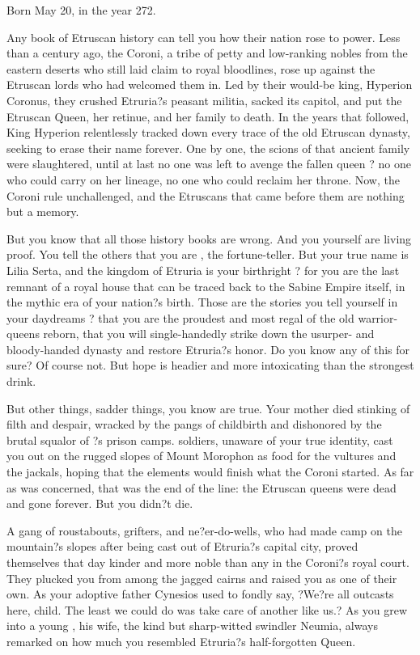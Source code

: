 \documentclass[char]{Kos}
\begin{document}
\name{\cBurglar{}}

Born May 20, in the year 272.

    Any book of Etruscan history can tell you how their nation rose to power. Less than a century ago, the Coroni, a tribe of petty and low-ranking nobles from the eastern deserts who still laid claim to royal bloodlines, rose up against the Etruscan lords who had welcomed them in. Led by their would-be king, Hyperion Coronus, they crushed Etruria?s peasant militia, sacked its capitol, and put the Etruscan Queen, her retinue, and her family to death. In the years that followed, King Hyperion relentlessly tracked down every trace of the old Etruscan dynasty, seeking to erase their name forever. One by one, the scions of that ancient family were slaughtered, until at last no one was left to avenge the fallen queen ? no one who could carry on her lineage, no one who could reclaim her throne. Now, the Coroni rule unchallenged, and the Etruscans that came before them are nothing but a memory. 

    But you know that all those history books are wrong. And you yourself are living proof. You tell the others that you are \cBurglar{}, the fortune-teller. But your true name is Lilia Serta, and the kingdom of Etruria is your birthright ? for you are the last remnant of a royal house that can be traced back to the Sabine Empire itself, in the mythic era of your nation?s birth. Those are the stories you tell yourself in your daydreams ? that you are the proudest and most regal of the old warrior-queens reborn, that you will single-handedly strike down \cEtruriaKing{} the usurper-\cEtruriaKing{\monarch} and \cEtruriaKing{\their} bloody-handed dynasty and restore Etruria?s honor. Do you know any of this for sure? Of course not. But hope is headier and more intoxicating than the strongest drink.

    But other things, sadder things, you know are true. Your mother died stinking of filth and despair, wracked by the pangs of childbirth and dishonored by the brutal squalor of \cEtruriaKing{\Monarch} \cEtruriaKing{}?s prison camps. \cEtruriaKing{\Their} soldiers, unaware of your true identity, cast you out on the rugged slopes of Mount Morophon as food for the vultures and the jackals, hoping that the elements would finish what the Coroni started. As far as \cEtruriaKing{\Monarch} \cEtruriaKing{} was concerned, that was the end of the line: the Etruscan queens were dead and gone forever. But you didn?t die. 

    A gang of roustabouts, grifters, and ne?er-do-wells, who had made camp on the mountain?s slopes after being cast out of Etruria?s capital city, proved themselves that day kinder and more noble than any in the Coroni?s royal court. They plucked you from among the jagged cairns and raised you as one of their own. As your adoptive father Cynesios used to fondly say, ?We?re all outcasts here, child. The least we could do was take care of another like us.? As you grew into a young \cBurglar{\human}, his wife, the kind but sharp-witted swindler Neumia, always remarked on how much you resembled Etruria?s half-forgotten Queen. 
\end{document}
